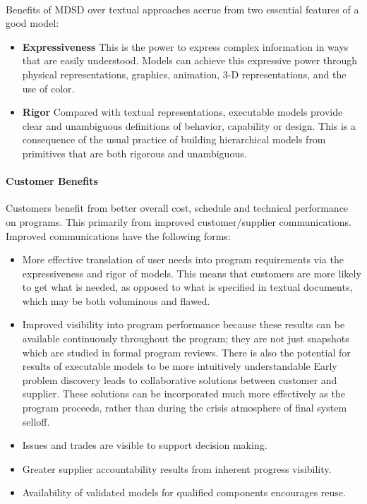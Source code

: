\documentclass[a4paper,12pt,twoside]{report}
\begin{document}
{			\paragraph{} {Benefits of MDSD over textual approaches accrue from two essential features of a good model: \cite{FoundationalConceptsMDSD}}
			\begin{itemize}
				\item \textbf{Expressiveness} This is the power to express complex information in ways that are easily understood. Models can achieve this expressive power through physical representations, graphics, animation, 3-D representations, and the use of color. 
				\item \textbf{Rigor} Compared with textual representations, executable models provide clear and unambiguous definitions of behavior, capability or design. This is a consequence of the usual practice of building hierarchical models from primitives that are both rigorous and unambiguous.
			\end{itemize}
			
			\paragraph{Customer Benefits} {Customers benefit from better overall cost, schedule and technical performance on  programs. This primarily from improved customer/supplier communications. Improved communications have the following forms: \cite{FoundationalConceptsMDSD}
			}
			\begin{itemize}
				\item More effective translation of user needs into program requirements via the expressiveness and rigor of models. This means that customers are more likely to get what is needed, as opposed to what is specified in textual documents, which may be both voluminous and flawed.
				\item Improved visibility into program performance because these results can be available continuously throughout the program; they are not just snapshots which are studied in formal program reviews. There is also the potential for results of executable models to be more intuitively understandable Early problem discovery leads to collaborative solutions between customer and supplier. These solutions can be incorporated much more effectively as the program proceeds, rather than during the crisis atmosphere of final system selloff.
				\item Issues and trades are visible to support decision making.
				\item Greater supplier accountability results from inherent progress visibility.
				\item Availability of validated models for qualified components encourages reuse.
			\end{itemize}
			
}
\end{document}
